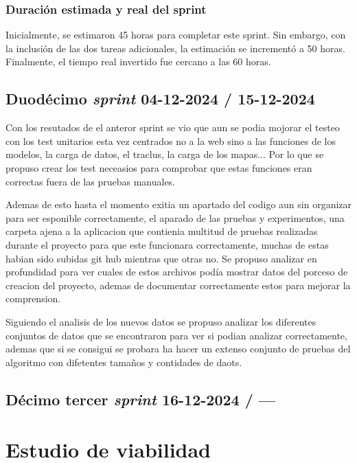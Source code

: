 \subsubsection{Duración estimada y real del sprint}

Inicialmente, se estimaron 45 horas para completar este sprint. Sin embargo, con la inclusión de las dos tareas adicionales, la estimación se incrementó a 50 horas. Finalmente, el tiempo real invertido fue cercano a las 60 horas.


\subsection{Duodécimo \textit{sprint} 04-12-2024 / 15-12-2024}

Con los resutados de el anteror sprint se vio que aun se podia mojorar el testeo con los test unitarios esta vez centrados no a la web sino a las funciones de los modelos, la carga de datos, el traclus, la carga de los mapas... Por lo que se propuso crear los test neceasios para comprobar que estas funciones eran correctas fuera de las pruebas manuales.

Ademas de esto hasta el momento exitia un apartado del codigo aun sin organizar para ser esponible correctamente, el aparado de las pruebas y experimentos, una carpeta ajena a la aplicacion que contienia multitud de pruebas realizadas durante el proyecto para que este funcionara correctamente, muchas de estas habian sido subidas git hub mientras que otras no. Se propuso analizar en profundidad para ver cuales de estos archivos podía mostrar datos del porceso de creacion del proyecto, ademas de documentar correctamente estos para mejorar la comprension.

Siguiendo el analisis de los nuevos datos se propuso analizar los diferentes conjuntos de datos que se encontraron para ver si podian analizar correctamente, ademas que si se consigui se probara ha hacer un extenso conjunto de pruebas del algoritmo con difetentes tamaños y contidades de daots.

\subsection{Décimo tercer \textit{sprint} 16-12-2024 / ---}



\section{Estudio de viabilidad}

